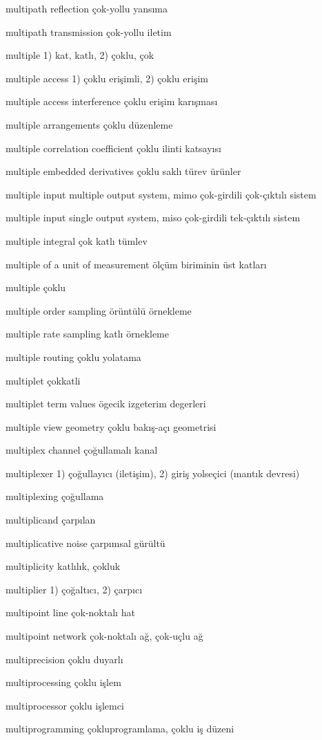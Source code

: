 \documentclass[12pt,fleqn]{article}\usepackage{../../common}
\begin{document}
multipath reflection çok-yollu yansıma

multipath transmission çok-yollu iletim

multiple 1) kat, katlı, 2) çoklu, çok

multiple access 1) çoklu erişimli, 2) çoklu erişim

multiple access interference çoklu erişim karışması

multiple arrangements çoklu düzenleme

multiple correlation coefficient çoklu ilinti katsayısı

multiple embedded derivatives çoklu saklı türev ürünler

multiple input multiple output system, mimo çok-girdili çok-çıktılı sistem

multiple input single output system, miso çok-girdili tek-çıktılı sistem

multiple integral çok katlı tümlev

multiple of a unit of measurement ölçüm biriminin üst katları

multiple çoklu

multiple order sampling örüntülü örnekleme

multiple rate sampling katlı örnekleme

multiple routing çoklu yolatama

multiplet çokkatli

multiplet term values ögecik izgeterim degerleri

multiple view geometry çoklu bakış-açı geometrisi

multiplex channel çoğullamalı kanal

multiplexer 1) çoğullayıcı (iletişim), 2) giriş yolseçici (mantık devresi)

multiplexing çoğullama

multiplicand çarpılan

multiplicative noise çarpımsal gürültü

multiplicity katlılık, çokluk

multiplier 1) çoğaltıcı, 2) çarpıcı

multipoint line çok-noktalı hat

multipoint network çok-noktalı ağ, çok-uçlu ağ

multiprecision çoklu duyarlı

multiprocessing çoklu işlem

multiprocessor çoklu işlemci

multiprogramming çokluprogramlama, çoklu iş düzeni
\end{document}
